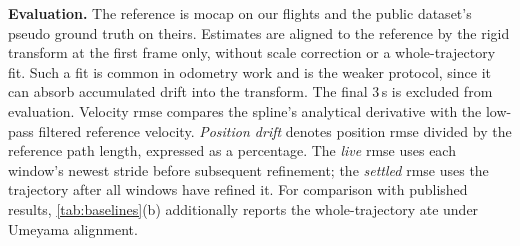\textbf{Evaluation.}  The reference is \ac{mocap} on our flights and the
public dataset's pseudo ground truth on theirs.
Estimates are aligned to the reference by the
rigid transform at the first frame only, without scale correction or
a whole-trajectory fit.  Such a fit is common in odometry work and is the
weaker protocol, since it can absorb accumulated drift into the transform.
The final 3\,s is excluded from evaluation.
Velocity \ac{rmse} compares the spline's analytical derivative with
the low-pass filtered reference velocity.  \emph{Position drift}
denotes position \ac{rmse} divided by the reference path length,
expressed as a percentage.  The \emph{live} \ac{rmse} uses each
window's newest stride before subsequent refinement; the
\emph{settled} \ac{rmse} uses the trajectory after all windows have
refined it.  For comparison with published results,
\autoref{tab:baselines}(b) additionally reports the whole-trajectory
\ac{ate} under Umeyama alignment.